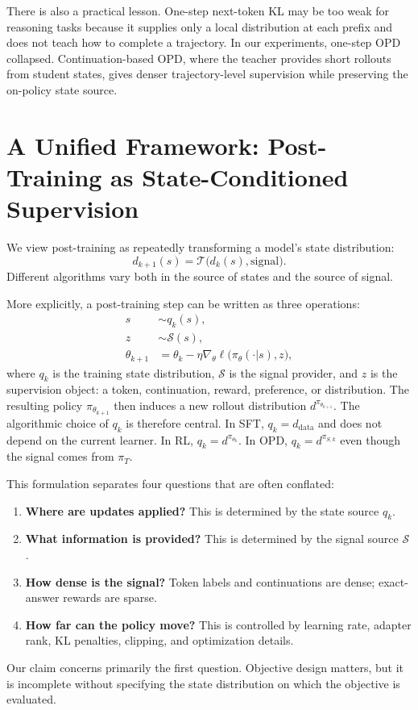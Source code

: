 \documentclass{article}
\begin{document}
There is also a practical lesson. One-step next-token KL may be too weak for
reasoning tasks because it supplies only a local distribution at each prefix and
does not teach how to complete a trajectory. In our experiments, one-step OPD
collapsed. Continuation-based OPD, where the teacher provides short rollouts
from student states, gives denser trajectory-level supervision while preserving
the on-policy state source.

\section{A Unified Framework: Post-Training as State-Conditioned Supervision}

We view post-training as repeatedly transforming a model's state distribution:
\begin{equation}
    d_{k+1}(s) = \mathcal{T}\big(d_k(s), \mathrm{signal}\big).
\end{equation}
Different algorithms vary both in the source of states and the source of signal.

More explicitly, a post-training step can be written as three operations:
\begin{align}
    s &\sim q_k(s), \\
    z &\sim \mathcal{S}(s), \\
    \theta_{k+1} &=
    \theta_k - \eta \nabla_\theta
    \ell\big(\pi_\theta(\cdot|s), z\big),
\end{align}
where $q_k$ is the training state distribution, $\mathcal{S}$ is the signal
provider, and $z$ is the supervision object: a token, continuation, reward,
preference, or distribution. The resulting policy $\pi_{\theta_{k+1}}$ then
induces a new rollout distribution $d^{\pi_{\theta_{k+1}}}$. The algorithmic
choice of $q_k$ is therefore central. In SFT, $q_k=d_{\mathrm{data}}$ and does
not depend on the current learner. In RL, $q_k=d^{\pi_{\theta_k}}$. In OPD,
$q_k=d^{\pi_{S,k}}$ even though the signal comes from $\pi_T$.

This formulation separates four questions that are often conflated:
\begin{enumerate}[leftmargin=*]
    \item \textbf{Where are updates applied?} This is determined by the state
    source $q_k$.
    \item \textbf{What information is provided?} This is determined by the
    signal source $\mathcal{S}$.
    \item \textbf{How dense is the signal?} Token labels and continuations are
    dense; exact-answer rewards are sparse.
    \item \textbf{How far can the policy move?} This is controlled by learning
    rate, adapter rank, KL penalties, clipping, and optimization details.
\end{enumerate}
Our claim concerns primarily the first question. Objective design matters, but
it is incomplete without specifying the state distribution on which the
objective is evaluated.
\end{document}
